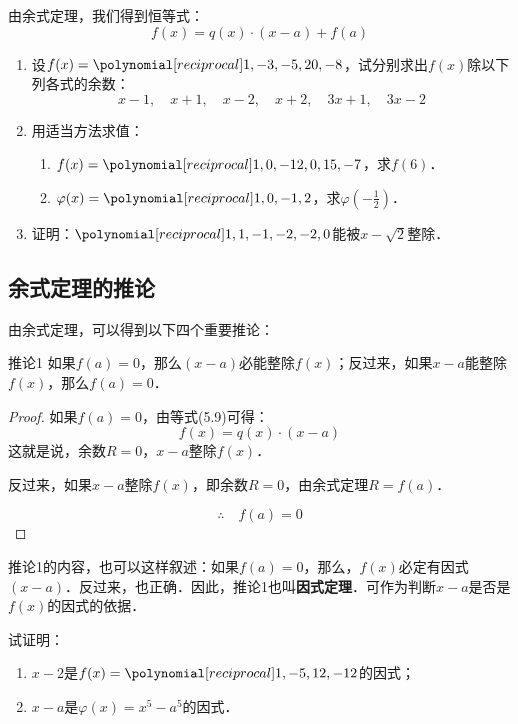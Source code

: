 由余式定理，我们得到恒等式：
\begin{equation}
    f(x)=q(x)\cdot (x-a)+f(a)
\end{equation}

\begin{ex}
\begin{enumerate}
    \item 设$f(x)=\poly{1,-3,-5,20,-8}$，试分别求出$f(x)$除以下列各式的余数：
    \[x-1,\quad x+1,\quad x-2,\quad x+2,\quad 3x+1,\quad 3x-2 \]
    \item 用适当方法求值：
    \begin{enumerate}
        \item $f(x)=\poly{1,0,-12,0,15,-7}$，求$f(6)$．
        \item $\varphi(x)=\poly{1,0,-1,2}$，求$\varphi\left(-\frac{1}{2}\right)$．
    \end{enumerate}
    \item 证明：$\poly{1,1,-1,-2,-2,0}$能被$x-\sqrt{2}$整除．
\end{enumerate}
\end{ex}

\subsection{余式定理的推论}
由余式定理，可以得到以下四个重要推论：
\begin{blk}{推论1}
    如果$f(a)=0$，那么$(x-a)$必能整除$f(x)$；反过来，如果$x-a$能整除$f(x)$，那么$f(a)=0$．
\end{blk}

\begin{proof}
    如果$f(a)=0$，由等式(5.9)可得：
    \[f(x)=q(x) \cdot (x-a)\]    
    这就是说，余数$R=0$，$x-a$整除$f(x)$．
    
    反过来，如果$x-a$整除$f(x)$，即余数$R=0$，由余式定理$R=f(a)$．
    
$$\therefore\quad f (a) =0$$
\end{proof}

推论1的内容，也可以这样叙述：如果$f(a)=0$，那么，$f(x)$必定有因式$(x-a)$．反过来，也正确．因此，推论1也叫\textbf{因式定理}．可作为判断$x-a$是否是$f(x)$的因式的依据．

\begin{example}
    试证明：
\begin{enumerate}
    \item $x-2$是$f(x)=\poly{1,-5,12,-12}$的因式；
    \item $x-a$是$\varphi(x)=x^5-a^5$的因式．
\end{enumerate}
\end{example}

